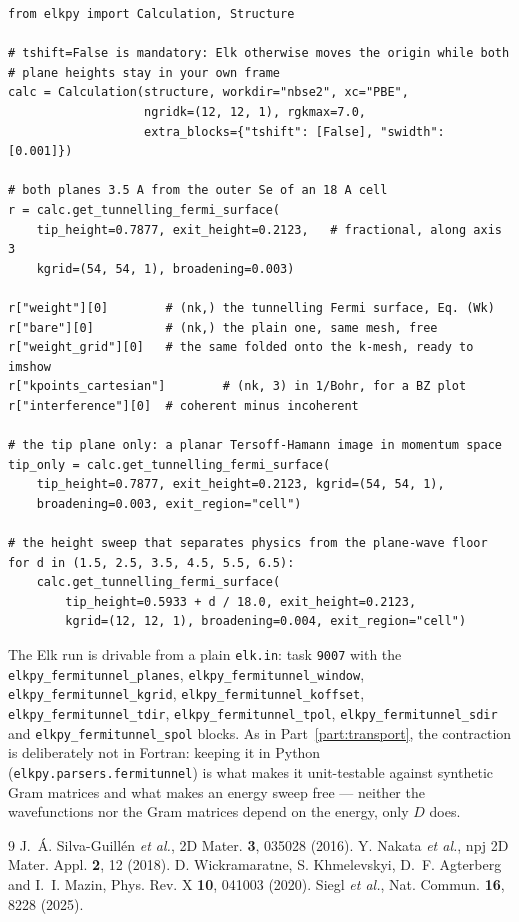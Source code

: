 \documentclass[11pt]{article}
\begin{document}
\begin{verbatim}
from elkpy import Calculation, Structure

# tshift=False is mandatory: Elk otherwise moves the origin while both
# plane heights stay in your own frame
calc = Calculation(structure, workdir="nbse2", xc="PBE",
                   ngridk=(12, 12, 1), rgkmax=7.0,
                   extra_blocks={"tshift": [False], "swidth": [0.001]})

# both planes 3.5 A from the outer Se of an 18 A cell
r = calc.get_tunnelling_fermi_surface(
    tip_height=0.7877, exit_height=0.2123,   # fractional, along axis 3
    kgrid=(54, 54, 1), broadening=0.003)

r["weight"][0]        # (nk,) the tunnelling Fermi surface, Eq. (Wk)
r["bare"][0]          # (nk,) the plain one, same mesh, free
r["weight_grid"][0]   # the same folded onto the k-mesh, ready to imshow
r["kpoints_cartesian"]        # (nk, 3) in 1/Bohr, for a BZ plot
r["interference"][0]  # coherent minus incoherent

# the tip plane only: a planar Tersoff-Hamann image in momentum space
tip_only = calc.get_tunnelling_fermi_surface(
    tip_height=0.7877, exit_height=0.2123, kgrid=(54, 54, 1),
    broadening=0.003, exit_region="cell")

# the height sweep that separates physics from the plane-wave floor
for d in (1.5, 2.5, 3.5, 4.5, 5.5, 6.5):
    calc.get_tunnelling_fermi_surface(
        tip_height=0.5933 + d / 18.0, exit_height=0.2123,
        kgrid=(12, 12, 1), broadening=0.004, exit_region="cell")
\end{verbatim}

The Elk run is drivable from a plain \texttt{elk.in}: task \texttt{9007} with
the \texttt{elkpy\_fermitunnel\_planes},
\texttt{elkpy\_fermitunnel\_window}, \texttt{elkpy\_fermitunnel\_kgrid},
\texttt{elkpy\_fermitunnel\_koffset}, \texttt{elkpy\_fermitunnel\_tdir},
\texttt{elkpy\_fermitunnel\_tpol}, \texttt{elkpy\_fermitunnel\_sdir} and
\texttt{elkpy\_fermitunnel\_spol} blocks. As in
Part~\ref{part:transport}, the contraction is deliberately not in Fortran:
keeping it in Python (\texttt{elkpy.parsers.fermitunnel}) is what makes it
unit-testable against synthetic Gram matrices and what makes an energy sweep
free --- neither the wavefunctions nor the Gram matrices depend on the energy,
only $D$ does.

\begin{thebibliography}{9}
 J.~\'A. Silva-Guill\'en \emph{et al.},
  2D Mater. \textbf{3}, 035028 (2016).
 Y. Nakata \emph{et al.},
  npj 2D Mater. Appl. \textbf{2}, 12 (2018).
 D. Wickramaratne, S. Khmelevskyi, D.~F. Agterberg
  and I.~I. Mazin, Phys. Rev. X \textbf{10}, 041003 (2020).
 Siegl \emph{et al.}, Nat. Commun. \textbf{16}, 8228
  (2025).
\end{thebibliography}
\end{document}
